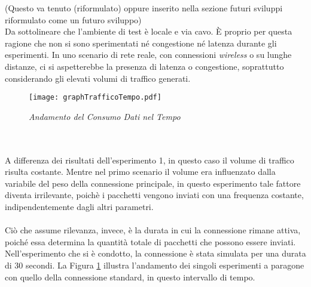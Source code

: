 \noindent (Questo va tenuto (riformulato) oppure inserito nella sezione futuri sviluppi riformulato come un futuro sviluppo)\\
Da sottolineare che l'ambiente di test è locale e via cavo. È proprio per questa ragione che non si sono sperimentati né congestione né latenza durante gli esperimenti. 
In uno scenario di rete reale, con connessioni \emph{wireless} o su lunghe distanze, ci si aspetterebbe la presenza di latenza o congestione, soprattutto considerando gli elevati volumi di traffico generati. 
\begin{figure}[!h]
    \centering
        \texttt{[image: graphTrafficoTempo.pdf]}
        \caption{\emph{Andamento del Consumo Dati nel Tempo}}
        \label{grafico23}
\end{figure}
\\\\
\noindent A differenza dei risultati dell'esperimento 1, in questo caso il volume di traffico risulta costante.
Mentre nel primo scenario il volume era influenzato dalla variabile del peso della connessione principale, in questo esperimento tale fattore diventa irrilevante,
poichè i pacchetti vengono inviati con una frequenza costante, indipendentemente dagli altri parametri.
\\\\
Ciò che assume rilevanza, invece, è la durata in cui la connessione rimane attiva, poiché essa determina la quantità totale di pacchetti che possono essere inviati.
Nell'esperimento che si è condotto, la connessione è stata simulata per una durata di 30 secondi. La Figura \ref{grafico23} illustra l'andamento dei singoli esperimenti a paragone con quello della connessione standard, in questo intervallo di tempo.

